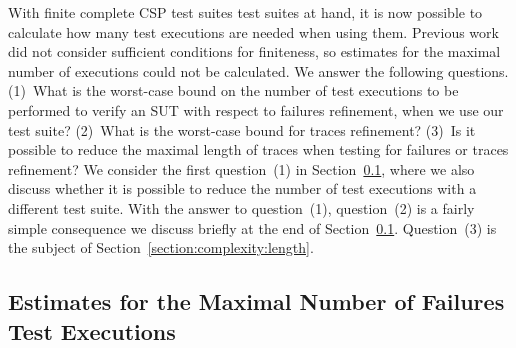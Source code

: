 \documentclass[3p,times]{elsarticle}
\newcommand{\epass}{{\text{\it pass}}}
\newcommand{\minhits}{\text{\it minHit}}
\begin{document}

 


With finite complete CSP test suites test suites at hand, it is now possible 
to calculate how many test executions are needed when using them.
Previous work did not consider sufficient conditions for finiteness, so
estimates for the maximal number 
of executions could not be calculated. 
We answer the following questions. (1)~What is
the worst-case bound on the number of test executions to be performed to
verify an SUT with respect to failures refinement, when we use our test
suite? (2)~What is the worst-case bound for traces refinement? (3)~Is it
possible to reduce the maximal length of traces when testing for failures or
traces refinement? We consider the first question~(1) in
Section~\ref{section:complexity:failures}, where we also discuss whether  
it is possible to reduce the number of test executions with a different test
suite.  With the answer to question~(1), question~(2) is a fairly simple
consequence we discuss briefly at the end of 
Section~\ref{section:complexity:failures}. Question~(3) is the subject of
Section~\ref{section:complexity:length}.

\subsection{Estimates for the Maximal Number of Failures Test Executions}
\label{section:complexity:failures}
\end{document}
